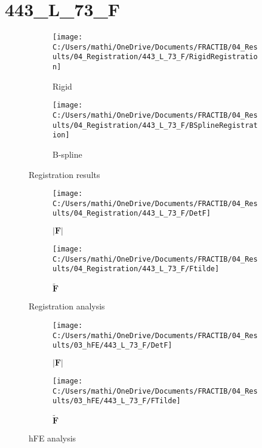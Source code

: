 \documentclass{article}%
\begin{document}
%
\newpage%
\section*{443\_L\_73\_F}%
\label{sec:443L73F}%


\begin{figure}[h!]%
\begin{subfigure}[b]{0.5\linewidth}%
\texttt{[image: C:/Users/mathi/OneDrive/Documents/FRACTIB/04\_Results/04\_Registration/443\_L\_73\_F/RigidRegistration]}%
\caption{Rigid}%
\end{subfigure}%
\begin{subfigure}[b]{0.5\linewidth}%
\texttt{[image: C:/Users/mathi/OneDrive/Documents/FRACTIB/04\_Results/04\_Registration/443\_L\_73\_F/BSplineRegistration]}%
\caption{B{-}spline}%
\end{subfigure}%
\caption{Registration results}%
\end{figure}

%


\begin{figure}[h!]%
\begin{subfigure}[b]{0.5\linewidth}%
\texttt{[image: C:/Users/mathi/OneDrive/Documents/FRACTIB/04\_Results/04\_Registration/443\_L\_73\_F/DetF]}%
\caption{$|\mathbf{F}|$}%
\end{subfigure}%
\begin{subfigure}[b]{0.5\linewidth}%
\texttt{[image: C:/Users/mathi/OneDrive/Documents/FRACTIB/04\_Results/04\_Registration/443\_L\_73\_F/Ftilde]}%
\caption{$\tilde{\mathbf{F}}$}%
\end{subfigure}%
\caption{Registration analysis}%
\end{figure}

%


\begin{figure}[h!]%
\begin{subfigure}[b]{0.5\linewidth}%
\texttt{[image: C:/Users/mathi/OneDrive/Documents/FRACTIB/04\_Results/03\_hFE/443\_L\_73\_F/DetF]}%
\caption{$|\mathbf{F}|$}%
\end{subfigure}%
\begin{subfigure}[b]{0.5\linewidth}%
\texttt{[image: C:/Users/mathi/OneDrive/Documents/FRACTIB/04\_Results/03\_hFE/443\_L\_73\_F/FTilde]}%
\caption{$\tilde{\mathbf{F}}$}%
\end{subfigure}%
\caption{hFE analysis}%
\end{figure}
\end{document}

